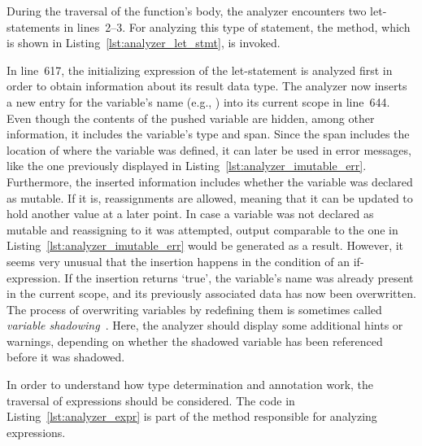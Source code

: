 During the traversal of the  function's body, the analyzer encounters two let-statements in lines~2--3.
For analyzing this type of statement, the  method, which is shown in Listing~\ref{lst:analyzer_let_stmt}, is invoked.


In line~617, the initializing expression of the let-statement is analyzed first in order to obtain information about its result data type.
The analyzer now inserts a new entry for the variable's name (e.g., ) into its current scope in line~644.
Even though the contents of the pushed variable are hidden, among other information, it includes the variable's type and span.
Since the span includes the location of where the variable was defined, it can later be used in error messages, like the one previously displayed in Listing~\ref{lst:analyzer_imutable_err}.
Furthermore, the inserted information includes whether the variable was declared as mutable.
If it is, reassignments are allowed, meaning that it can be updated to hold another value at a later point.
In case a variable was not declared as mutable and reassigning to it was attempted,
output comparable to the one in Listing~\ref{lst:analyzer_imutable_err} would be generated as a result.
However, it seems very unusual that the insertion happens in the condition of an if-expression.
If the insertion returns `true', the variable's name was already present in the current scope, and its previously associated data has now been overwritten.
The process of overwriting variables by redefining them is sometimes called \emph{variable shadowing}~\cite[p.~34]{Klabnik2019}.
Here, the analyzer should display some additional hints or warnings, depending on whether the shadowed variable has been referenced before it was shadowed.

In order to understand how type determination and annotation work, the traversal of expressions should be considered.
The code in Listing~\ref{lst:analyzer_expr} is part of the method responsible for analyzing expressions.


